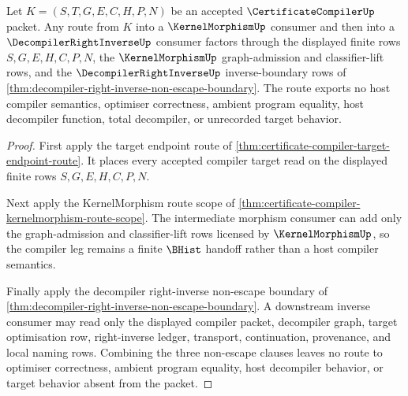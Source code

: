 \begin{theorem}
\label{thm:certificate-compiler-kernelmorphism-decompiler-boundary}
Let $K=(S,T,G,E,C,H,P,N)$ be an accepted $\CertificateCompilerUp$ packet. Any route from $K$ into a $\KernelMorphismUp$ consumer and then into a $\DecompilerRightInverseUp$ consumer factors through the displayed finite rows $S,G,E,H,C,P,N$, the $\KernelMorphismUp$ graph-admission and classifier-lift rows, and the $\DecompilerRightInverseUp$ inverse-boundary rows of \autoref{thm:decompiler-right-inverse-non-escape-boundary}. The route exports no host compiler semantics, optimiser correctness, ambient program equality, host decompiler function, total decompiler, or unrecorded target behavior.
\end{theorem}
\begin{proof}
First apply the target endpoint route of \autoref{thm:certificate-compiler-target-endpoint-route}. It places every accepted compiler target read on the displayed finite rows $S,G,E,H,C,P,N$.

Next apply the KernelMorphism route scope of \autoref{thm:certificate-compiler-kernelmorphism-route-scope}. The intermediate morphism consumer can add only the graph-admission and classifier-lift rows licensed by $\KernelMorphismUp$, so the compiler leg remains a finite $\BHist$ handoff rather than a host compiler semantics.

Finally apply the decompiler right-inverse non-escape boundary of \autoref{thm:decompiler-right-inverse-non-escape-boundary}. A downstream inverse consumer may read only the displayed compiler packet, decompiler graph, target optimisation row, right-inverse ledger, transport, continuation, provenance, and local naming rows. Combining the three non-escape clauses leaves no route to optimiser correctness, ambient program equality, host decompiler behavior, or target behavior absent from the packet.
\end{proof}


